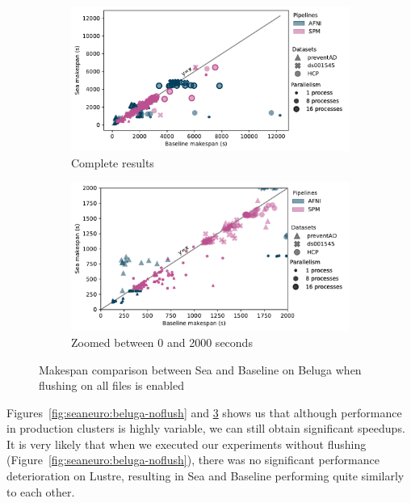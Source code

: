 \begin{figure}
\begin{subfigure}{\textwidth}
    \centering
    \captionsetup{width=.85\linewidth}
    \includegraphics[width=\columnwidth]{figures/sea-neuro/beluga_withflush_nozoom.pdf}%
    \caption{Complete results}\label{fig:seaneuro:belugafullwf}
\end{subfigure}
\begin{subfigure}{\textwidth}
    \centering
    \captionsetup{width=.85\linewidth}
    \includegraphics[width=\linewidth]{figures/sea-neuro/beluga_withflush_zoom.pdf}
    \caption{Zoomed between 0 and 2000 seconds}\label{fig:seaneuro:belugazoomwf}
\end{subfigure}
\caption{Makespan comparison between Sea and Baseline on Beluga when flushing on all files is enabled}
\label{fig:seaneuro:beluga-wflush}
\end{figure}

  Figures~\ref{fig:seaneuro:beluga-noflush} and \ref{fig:seaneuro:beluga-wflush}
  shows us that although performance in production clusters is highly variable, we can
  still obtain significant speedups. It is very likely that when we executed our experiments
  without flushing (Figure~\ref{fig:seaneuro:beluga-noflush}), there was no significant performance
  deterioration on Lustre, resulting in Sea and Baseline performing quite similarly to each other.
  
